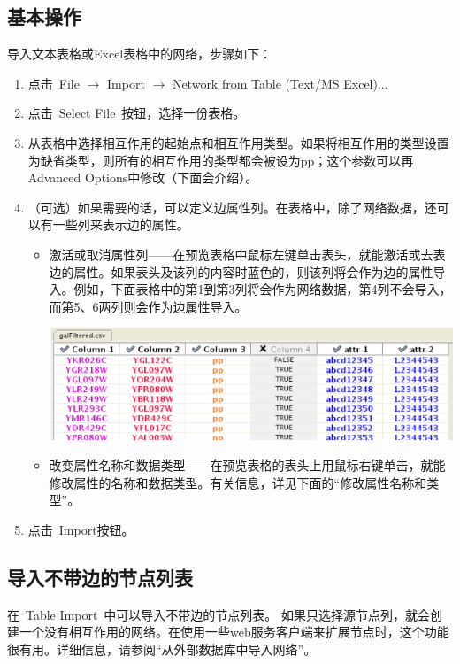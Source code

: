 \subsection{基本操作}

导入文本表格或Excel表格中的网络，步骤如下： 
\begin{enumerate}
\item 点击~File $\rightarrow$ Import $\rightarrow$ Network from Table (Text/MS Excel)... 
\item 点击~Select File~按钮，选择一份表格。 
\item 从表格中选择相互作用的起始点和相互作用类型。如果将相互作用的类型设置为缺省类型，则所有的相互作用的类型都会被设为pp；这个参数可以再Advanced Options中修改（下面会介绍）。
\item （可选）如果需要的话，可以定义边属性列。在表格中，除了网络数据，还可以有一些列来表示边的属性。
\begin{itemize}
\item 激活或取消属性列——在预览表格中鼠标左键单击表头，就能激活或去表边的属性。如果表头及该列的内容时蓝色的，则该列将会作为边的属性导入。例如，下面表格中的第1到第3列将会作为网络数据，第4列不会导入，而第5、6两列则会作为边属性导入。
\begin{center}
\includegraphics[width=.8\textwidth]{images/network_table_sample.png} 
\end{center}
\item 改变属性名称和数据类型——在预览表格的表头上用鼠标右键单击，就能修改属性的名称和数据类型。有关信息，详见下面的``修改属性名称和类型''。
\end{itemize}
\item 点击~Import按钮。 
\end{enumerate}

\subsection{导入不带边的节点列表}
在~Table Import~中可以导入不带边的节点列表。 如果只选择源节点列，就会创建一个没有相互作用的网络。在使用一些web服务客户端来扩展节点时，这个功能很有用。详细信息，请参阅``从外部数据库中导入网络''。


